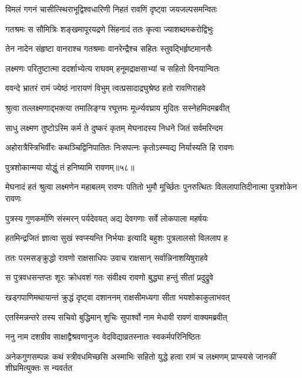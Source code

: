 \twolineshloka
{विमलं गगनं चासीत्स्थिराभूद्विश्वधारिणी}
{निहतं रावणिं दृष्ट्वा जयजल्पसमन्वितः} %

\twolineshloka
{गतश्रमः स सौमित्रिः शङ्खमापूरयद्रणे}
{सिंहनादं ततः कृत्वा ज्याशब्दमकरोद्विभुः} %

\twolineshloka
{तेन नादेन संहृष्टा वानराश्च गतश्रमाः}
{वानरेन्द्रैश्च सहितः स्तुवद्भिर्हृष्टमानसैः} %

\twolineshloka
{लक्ष्मणः परितुष्टात्मा ददर्शाभ्येत्य राघवम्}
{हनूमद्राक्षसाभ्यां च सहितो विनयान्वितः} %

\twolineshloka
{ववन्दे भ्रातरं रामं ज्येष्ठं नारायणं विभुम्}
{त्वत्प्रसादाद्रघुश्रेष्ठ हतो रावणिराहवे} %

\twolineshloka
{श्रुत्वा तल्लक्ष्मणाद्भक्त्या तमालिङ्ग्य रघूत्तमः}
{मूर्ध्न्यवघ्राय मुदितः सस्नेहमिदमब्रवीत्} %

\twolineshloka
{साधु लक्ष्मण तुष्टोऽस्मि कर्म ते दुष्करं कृतम्}
{मेघनादस्य निधने जितं सर्वमरिन्दम} %

\twolineshloka
{अहोरात्रैस्त्रिभिर्वीरः कथञ्चिद्विनिपातितः}
{निःसपत्नः कृतोऽस्म्यद्य निर्यास्यति हि रावणः} %

{पुत्रशोकान्मया योद्धुं तं हनिष्यामि रावणम्॥५८॥} %


\threelineshloka
{मेघनादं हतं श्रुत्वा लक्ष्मणेन महाबलम्}
{रावणः पतितो भुमौ मूर्च्छितः पुनरुत्थितः}
{विललापातिदीनात्मा पुत्रशोकेन रावणः} %

\twolineshloka
{पुत्रस्य गुणकर्माणि संस्मरन् पर्यदेवयत्}
{अद्य देवगणाः सर्वे लोकपाला महर्षयः} %

\twolineshloka
{हतमिन्द्रजितं ज्ञात्वा सुखं स्वप्स्यन्ति निर्भयाः}
{इत्यादि बहुशः पुत्रलालसो विललाप ह} %

\twolineshloka
{ततः परमसङ्क्रुद्धो रावणो राक्षसाधिपः}
{उवाच राक्षसान् सर्वान्निनाशयिषुराहवे} %

\twolineshloka
{स पुत्रवधसन्तप्तः शूरः क्रोधवशं गतः}
{संवीक्ष्य रावणो बुद्ध्या हन्तुं सीतां प्रदुद्रुवे} %

\twolineshloka
{खड्गपाणिमथायान्तं क्रुद्धं दृष्ट्वा दशाननम्}
{राक्षसीमध्यगा सीता भयशोकाकुलाभवत्} %

\twolineshloka
{एतस्मिन्नन्तरे तस्य सचिवो बुद्धिमान् शुचिः}
{सुपार्श्वो नाम मेधावी रावणं वाक्यमब्रवीत्} %

\twolineshloka
{ननु नाम दशग्रीव साक्षाद्वैश्रवणानुजः}
{वेदविद्याव्रतस्नातः स्वकर्मपरिनिष्ठितः} %

\threelineshloka
{अनेकगुणसम्पन्नः कथं स्त्रीवधमिच्छसि}
{अस्माभिः सहितो युद्धे हत्वा रामं च लक्ष्मणम्}
{प्राप्स्यसे जानकीं शीघ्रमित्युक्तः स न्यवर्तत} %

